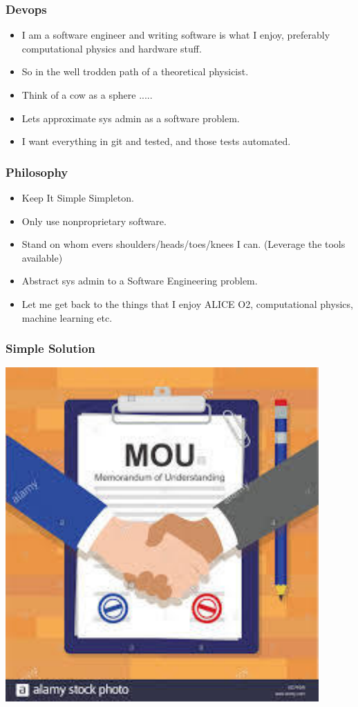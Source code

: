 \documentclass{beamer}
\begin{document}
\begin{frame}
  \frametitle{Devops}
    \begin{itemize}
            \item<1-> I am a software engineer and writing software is what I enjoy, preferably computational physics and hardware stuff.
            \item<2-> So in the well trodden path of a theoretical physicist.
            \item<3-> Think of a cow as a sphere .....
            \item<4-> Lets approximate sys admin as a software problem.
            \item<5-> I want everything in git and tested, and those tests automated.
    \end{itemize}

\end{frame}
\begin{frame}
  \frametitle{Philosophy}
  \begin{itemize}
    \item Keep It Simple Simpleton.
    \item Only use nonproprietary software.
    \item Stand on whom evers shoulders/heads/toes/knees I can. (Leverage the tools available)
    \item Abstract sys admin to a Software Engineering problem.
    \item Let me get back to the things that I enjoy ALICE O2, computational physics, machine learning etc.
  \end{itemize}
\end{frame}

\begin{frame}
  \frametitle{Simple Solution}
    \center\includegraphics[scale=0.5]{MOU-pic.pdf} \\
\end{frame}
\end{document}
